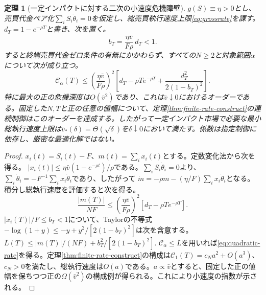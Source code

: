 \documentclass[11pt]{article}
\numberwithin{equation}{section}
\newtheorem{theorem}{定理}[section]
\theoremstyle{definition}
\theoremstyle{remark}
\begin{document}
\begin{theorem}[一定インパクトに対する二次の小速度危機障壁]\label{thm:quadratic-rate}
$g(S)\equiv\eta>0$とし、売買代金ペア化$\sum_iS_i\dot\theta_i=0$を仮定し、総売買執行速度上限\eqref{eq:grossrate}を課す。$d_T=1-e^{-\rho T}$と書き、次を置く。
\begin{equation}\label{eq:bsmall}
 b_T=\frac{\eta\bar v}{F\rho}\,d_T<1.
\end{equation}
すると終端売買代金ゼロ条件の有無にかかわらず、\emph{すべての}$N\ge2$と対象範囲$\alpha$について次が成り立つ。
\begin{equation}\label{eq:quadratic-rate}
\boxed{\ \mathcal C_\alpha(T)\le
\left(\frac{\eta\bar v}{F\rho}\right)^2
\left[d_T-\rho T e^{-\rho T}
 +\frac{d_T^2}{2(1-b_T)^2}\right].\ }
\end{equation}
特に最大の正の危機深度は$O(\bar v^2)$であり、これは$\bar v\downarrow0$におけるオーダーである。固定した$N,T$と正の任意の値幅について、定理\ref{thm:finite-rate-construct}の連続制御はこの\emph{オーダーを達成する}。したがって一定インパクト市場で必要な最小総執行速度上限は$\bar v_*(\delta)=\Theta(\sqrt\delta)$を$\delta\downarrow0$において満たす。係数は指定制御に依存し、厳密な最適化解ではない。
\end{theorem}
\begin{proof}
$x_i(t)=S_i(t)-F$、$m(t)=\sum_i x_i(t)$とする。定数変化法から次を得る。
$|x_i(t)|\le\eta\bar v(1-e^{-\rho t})/\rho$である。$\sum_iS_i\dot\theta_i=0$より、
$\sum_i\dot\theta_i=-F^{-1}\sum_i x_i\dot\theta_i$であり、したがって
$\dot m=-\rho m-(\eta/F)\sum_i x_i\dot\theta_i$となる。積分し総執行速度を評価すると次を得る。
\begin{equation}\label{eq:meanprice}
\frac{|m(T)|}{NF}\le
\left(\frac{\eta\bar v}{F\rho}\right)^2
 [d_T-\rho T e^{-\rho T}].
\end{equation}
$|x_i(T)|/F\le b_T<1$について、Taylorの不等式
$-\log(1+y)\le-y+y^2/[2(1-b_T)^2]$は次を含意する。
$\overline L(T)\le |m(T)|/(NF)+b_T^2/[2(1-b_T)^2]$.
$\mathcal C_\alpha\le\overline L$を用いれば\eqref{eq:quadratic-rate}を得る。定理\ref{thm:finite-rate-construct}の構成は$\mathcal C_1(T)=c_Na^2+O(a^3)$、$c_N>0$を満たし、総執行速度は$O(a)$である。$a\propto\bar v$とすると、固定した正の値幅を保ちつつ正の$\Omega(\bar v^2)$の構成例が得られる。これにより小速度の指数が示される。
\end{proof}
\end{document}
